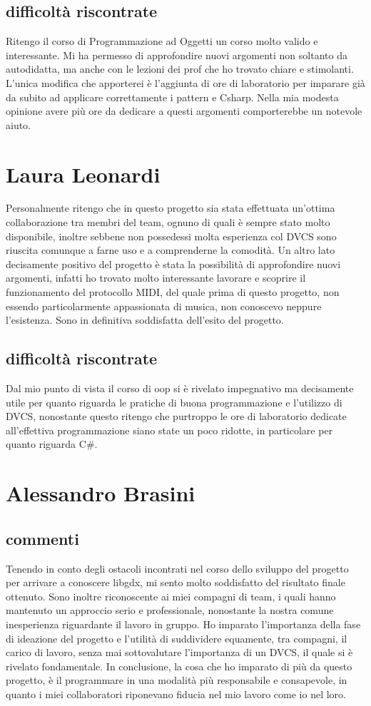 \documentclass[a4paper,12pt]{report}
\begin{document}
\subsection{difficoltà riscontrate}
Ritengo il corso di Programmazione ad Oggetti un corso molto valido e interessante. 
Mi ha permesso di approfondire nuovi argomenti non soltanto da autodidatta, ma anche con le lezioni dei prof 
che ho trovato chiare e stimolanti. L'unica modifica che apporterei è l'aggiunta di ore di laboratorio per
imparare già da subito ad applicare correttamente i pattern e Csharp. Nella mia modesta opinione avere più ore da dedicare a questi argomenti
comporterebbe un notevole aiuto.
\newpage
\section{Laura Leonardi}
Personalmente ritengo che in questo progetto sia stata effettuata un'ottima collaborazione tra membri del team, ognuno di quali è sempre stato molto disponibile, inoltre sebbene non possedessi molta esperienza col DVCS sono riuscita comunque a farne uso e a comprenderne la comodità. Un altro lato decisamente positivo del progetto è stata la possibilità di approfondire nuovi argomenti, infatti ho trovato molto interessante lavorare e scoprire il funzionamento del protocollo MIDI, del quale prima di questo progetto, non essendo particolarmente appassionata di musica, non conoscevo neppure l'esistenza. Sono in definitiva soddisfatta dell'esito del progetto.
\subsection{difficoltà riscontrate}
Dal mio punto di vista il corso di oop si è rivelato impegnativo ma decisamente utile per quanto riguarda le pratiche di buona programmazione e l'utilizzo di DVCS, nonostante questo ritengo che purtroppo le ore di laboratorio dedicate all'effettiva programmazione siano state un poco ridotte, in particolare per quanto riguarda C\#.
\newpage

\section{Alessandro Brasini}
\subsection{commenti}
Tenendo in conto degli ostacoli incontrati nel corso dello sviluppo del progetto per arrivare a conoscere libgdx, mi sento molto soddisfatto del risultato finale ottenuto.
Sono inoltre riconoscente ai miei compagni di team, i quali hanno mantenuto un approccio serio e professionale, nonostante la nostra comune inesperienza riguardante il lavoro in gruppo.
Ho imparato l'importanza della fase di ideazione del progetto e l'utilità di suddividere equamente, tra compagni, il carico di lavoro, senza mai sottovalutare l'importanza di un DVCS, il quale si è rivelato fondamentale.
In conclusione, la cosa che ho imparato di più da questo progetto, è il programmare in una modalità più responsabile e consapevole, in quanto i miei collaboratori riponevano fiducia nel mio lavoro come io nel loro.
\end{document}
